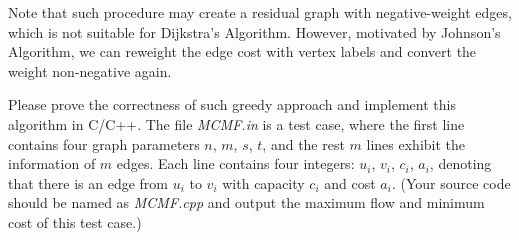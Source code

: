 \documentclass[12pt,a4paper]{article}
\theoremstyle{definition}
\begin{document}
\begin{enumerate}
Note that such procedure may create a residual graph with negative-weight edges, which is not suitable for Dijkstra's Algorithm. However, motivated by Johnson's Algorithm, we can reweight the edge cost with vertex labels and convert the weight non-negative again.

Please prove the correctness of such greedy approach and implement this algorithm in C/C++. The file \emph{MCMF.in} is a test case, where the first line contains four graph parameters $n$, $m$, $s$, $t$, and the rest $m$ lines exhibit the information of $m$ edges. Each line contains four integers: $u_i$, $v_i$, $c_i$, $a_i$, denoting that there is an edge from $u_i$ to $v_i$ with capacity $c_i$ and cost $a_i$. {\color{blue}(Your source code should be named as \emph{MCMF.cpp} and output the maximum flow and minimum cost of this test case.)}

\begin{center}
\end{center}
\end{enumerate}
\end{document}
